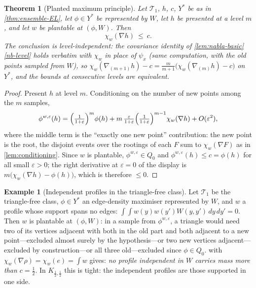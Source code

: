 \documentclass[11pt]{article}
\newtheorem{theorem}{Theorem}
\theoremstyle{definition}
\newtheorem{example}[example]{Example}
\newcommand{\T}{\mathcal{T}}
\newcommand{\eps}{\varepsilon}
\begin{document}
\begin{theorem}[Planted maximum principle]\label{thm:planted-max}
Let $\T_1$, $h$, $c$, $Y^\ast$ be as in \cref{thm:ensemble-EL}, let $\phi\in Y^\ast$
be represented by $W$, let $h$ be presented at a level $m$, and let $w$ be plantable
at $(\phi,W)$.  Then
\[
  \chi_w(\nabla h)\ \le\ c .
\]
The conclusion is level-independent: the covariance identity of
\cref{lem:nabla-basic}\ref{nb-level} holds verbatim with $\chi_w$ in place of
$\psi_x$ (same computation, with the old points sampled from $W$), so
$\chi_w(\nabla_{(m+1)}h)-c=\frac m{m+1}\bigl(\chi_w(\nabla_{(m)}h)-c\bigr)$ on
$Y^\ast$, and the bounds at consecutive levels are equivalent.
\end{theorem}

\begin{proof}
Present $h$ at level $m$.  Conditioning on the number of new points among the $m$
samples,
\[
  \phi^{w,\eps}(h)
  =\Bigl(\tfrac1{1+\eps}\Bigr)^{m}\phi(h)
  +m\,\tfrac{\eps}{1+\eps}\Bigl(\tfrac1{1+\eps}\Bigr)^{m-1}\chi_w(\nabla h)
  +O(\eps^2),
\]
where the middle term is the ``exactly one new point'' contribution: the new point is
the root, the disjoint events over the rootings of each $F$ sum to
$\chi_w(\nabla F)$ as in \cref{lem:conditioning}.  Since $w$ is plantable,
$\phi^{w,\eps}\in Q_0$ and $\phi^{w,\eps}(h)\le c=\phi(h)$ for all small $\eps>0$;
the right derivative at $\eps=0$ of the display is
$m\bigl(\chi_w(\nabla h)-\phi(h)\bigr)$, which is therefore $\le0$.
\end{proof}

\begin{example}[Independent profiles in the triangle-free class]\label{ex:planted-triangle-free}
Let $\T_1$ be the triangle-free class, $\phi\in Y^\ast$ an edge-density maximiser
represented by $W$, and $w$ a profile whose support spans no edges:
$\int\!\!\int w(y)w(y')W(y,y')\,dy\,dy'=0$.  Then $w$ is plantable at $(\phi,W)$: in a sample from
$\phi^{w,\eps}$, a triangle would need two of its vertices adjacent with both in the
old part and both adjacent to a new point---excluded almost surely by the
hypothesis---or two new vertices adjacent---excluded by construction---or all three
old---excluded since $\phi\in Q_0$.   with
$\chi_w(\nabla\rho)=\chi_w(e)=\int w$ gives: \emph{no profile independent in $W$
carries mass more than $c=\frac12$}.  In $K_{\frac12,\frac12}$ this is tight: the
independent profiles are those supported in one side.
\end{example}
\end{document}
